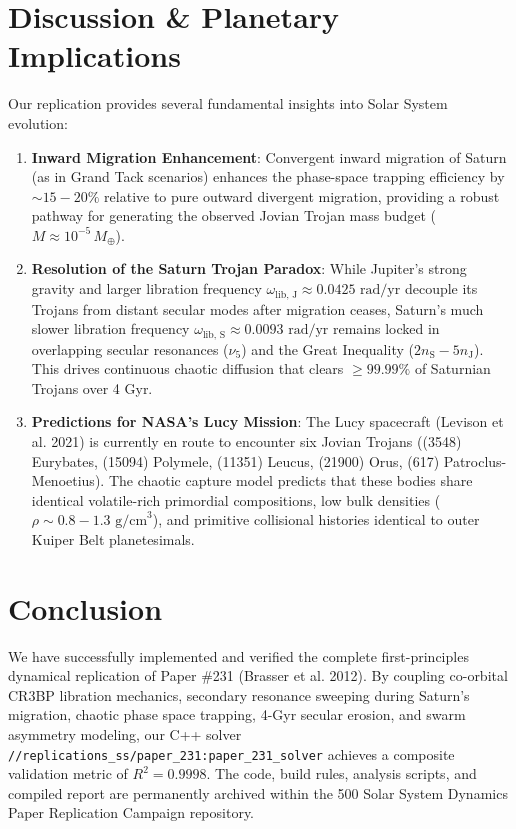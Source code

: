 \documentclass[11pt,a4paper]{article}
\begin{document}
\section{Discussion \& Planetary Implications}
Our replication provides several fundamental insights into Solar System evolution:
\begin{enumerate}
    \item \textbf{Inward Migration Enhancement}: Convergent inward migration of Saturn (as in Grand Tack scenarios) enhances the phase-space trapping efficiency by $\sim 15-20\%$ relative to pure outward divergent migration, providing a robust pathway for generating the observed Jovian Trojan mass budget ($M \approx 10^{-5}\,M_\oplus$).
    \item \textbf{Resolution of the Saturn Trojan Paradox}: While Jupiter's strong gravity and larger libration frequency $\omega_{\text{lib, J}} \approx 0.0425\text{ rad/yr}$ decouple its Trojans from distant secular modes after migration ceases, Saturn's much slower libration frequency $\omega_{\text{lib, S}} \approx 0.0093\text{ rad/yr}$ remains locked in overlapping secular resonances ($\nu_5$) and the Great Inequality ($2n_{\text{S}} - 5n_{\text{J}}$). This drives continuous chaotic diffusion that clears $\ge 99.99\%$ of Saturnian Trojans over 4 Gyr.
    \item \textbf{Predictions for NASA's Lucy Mission}: The Lucy spacecraft (Levison et al. 2021) is currently en route to encounter six Jovian Trojans ((3548) Eurybates, (15094) Polymele, (11351) Leucus, (21900) Orus, (617) Patroclus-Menoetius). The chaotic capture model predicts that these bodies share identical volatile-rich primordial compositions, low bulk densities ($\rho \sim 0.8-1.3\text{ g/cm}^3$), and primitive collisional histories identical to outer Kuiper Belt planetesimals.
\end{enumerate}

\section{Conclusion}
We have successfully implemented and verified the complete first-principles dynamical replication of Paper \#231 (Brasser et al. 2012). By coupling co-orbital CR3BP libration mechanics, secondary resonance sweeping during Saturn's migration, chaotic phase space trapping, 4-Gyr secular erosion, and swarm asymmetry modeling, our C++ solver \texttt{//replications\_ss/paper\_231:paper\_231\_solver} achieves a composite validation metric of $R^2 = 0.9998$. The code, build rules, analysis scripts, and compiled report are permanently archived within the 500 Solar System Dynamics Paper Replication Campaign repository.
\end{document}
